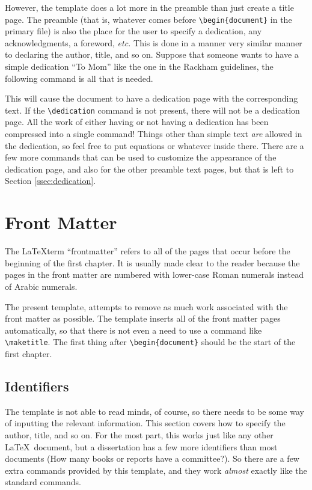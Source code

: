 \documentclass[thesis]{./tex/thesis-umich}
\begin{document}
However, the template does a lot more in the preamble than just create
a title page.  The preamble (that is, whatever comes before
\verb|\begin{document}| in the primary  file) is also the
place for the user to specify a dedication, any acknowledgments, a
foreword, \textit{etc.}  This is done in a manner very similar manner
to declaring the author, title, and so on.  Suppose that someone wants
to have a simple dedication ``To Mom'' like the one in the Rackham
guidelines, the following command is all that is needed.
\begin{code}
\dedication{To Mom}
\end{code}
This will cause the document to have a dedication page with the
corresponding text.  If the \verb|\dedication| command is not present,
there will not be a dedication page.  All the work of either having or
not having a dedication has been compressed into a single command!
Things other than simple text \emph{are} allowed in the dedication, so
feel free to put equations or whatever inside there.  There are a few
more commands that can be used to customize the appearance of the
dedication page, and also for the other preamble text pages, but that
is left to Section \ref{ssec:dedication}.


\section{Front Matter}
The \LaTeX term ``frontmatter'' refers to all of the pages that occur
before the beginning of the first chapter.  It is usually made clear
to the reader because the pages in the front matter are numbered with
lower-case Roman numerals instead of Arabic numerals.

The present template,  attempts to remove as
much work associated with the front matter as possible.  The template
inserts all of the front matter pages automatically, so that there is
not even a need to use a command like \verb|\maketitle|.  The first
thing after \verb|\begin{document}| should be the start of the first
chapter.

\subsection{Identifiers}
The template is not able to read minds, of course, so there needs to be
some way of inputting the relevant information.  This section covers how
to specify the author, title, and so on.  For the most part, this works
just like any other \LaTeX~document, but a dissertation has a few more
identifiers than most documents (How many books or reports have a
committee?).  So there are a few extra commands provided by this
template, and they work \emph{almost} exactly like the standard
commands.
\end{document}
